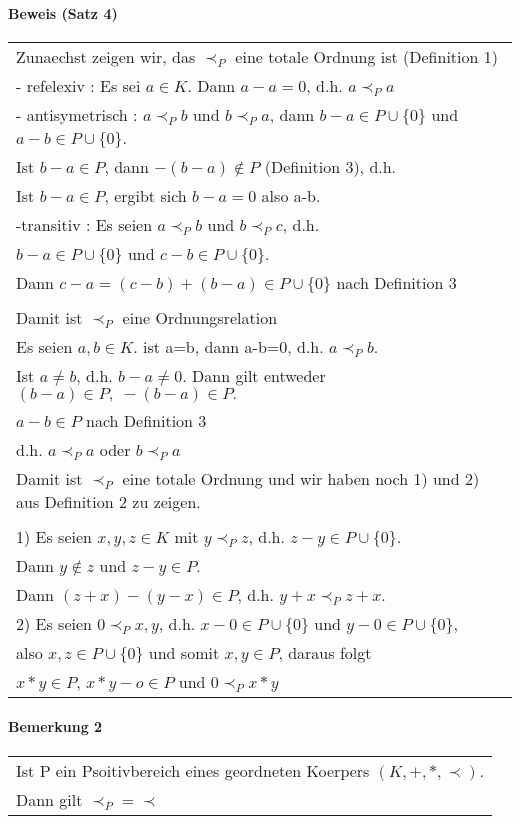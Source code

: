 \documentclass{scrartcl}
\begin{document}
\paragraph{Beweis (Satz 4)}
\begin{tabbing}
\begin{tabular}{l}
Zunaechst zeigen wir, das $\prec_P$ eine totale Ordnung ist (Definition 1)\\
- refelexiv : Es sei $a\in K$. Dann $a-a=0$, d.h. $a \prec_P a$ \\
- antisymetrisch : $a \prec_P b$ und $b \prec_P a$, dann $b-a\in P\cup\{ 0\}$ und $a-b\in P\cup \{ 0\}$.\\
Ist $b-a\in P$, dann $-(b-a)\notin P$ (Definition 3), d.h.\\
Ist $b-a\in P$, ergibt sich $b-a=0$ also a-b.\\
-transitiv : Es seien $a\prec_P b$ und $b\prec_P c$, d.h.\\
$b-a\in P\cup\{ 0\}$ und $c-b\in P\cup\{ 0\}$.\\
Dann $c-a=(c-b) + (b-a)\in P\cup\{ 0\}$ nach Definition 3\\
\\
Damit ist $\prec_P$ eine Ordnungsrelation\\
Es seien $a,b\in K.$ ist a=b, dann a-b=0, d.h. $a \prec_P b$.\\
Ist $a \neq b$, d.h. $b-a \neq 0$. Dann gilt entweder $(b-a)\in P,\;-(b-a)\in P.$\\
$a-b\in P$ nach Definition 3\\
d.h. $a \prec_P a$ oder $b \prec_P a$\\
Damit ist $\prec_P$ eine totale Ordnung und wir haben noch 1) und 2) aus Definition 2 zu zeigen.\\
\\
1) Es seien $x,y,z\in K$ mit $y \prec_P z$, d.h. $z-y\in P\cup\{ 0\}$.\\
Dann $y \notin z$ und $z-y\in P$.\\
Dann $(z + x) - (y-x)\in P$, d.h. $y+x \prec_P z+x.$\\
2) Es seien $0 \prec_P x,y$, d.h. $x-0\in P\cup \{ 0\}$ und $y-0\in P\cup\{ 0\}$,\\
also $x,z \in P\cup\{ 0\}$ und somit $x,y\in P$, daraus folgt \\
$x*y\in P$, $x*y-o\in P$ und $0 \prec_P x*y$
\end{tabular}
\end{tabbing}

\paragraph{Bemerkung 2}
\begin{tabbing}
\begin{tabular}{l}
Ist P ein Psoitivbereich eines geordneten Koerpers $(K,+,*,\prec)$.\\
Dann gilt $\prec_P = \prec$
\end{tabular}
\end{tabbing}
\end{document}
